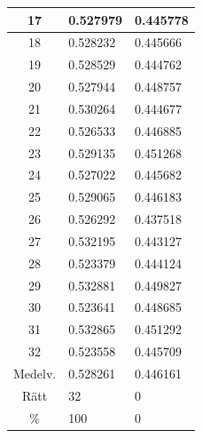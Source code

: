 \documentclass[a4paper,10pt]{article}
\begin{document}
\begin{centering}
{\begin{tabular}{ l | l | l| }
\multicolumn{1}{|c|}{17}   & 0.527979 & 0.445778 \\ \hline
\multicolumn{1}{|c|}{18}   & 0.528232 & 0.445666 \\ \hline
\multicolumn{1}{|c|}{19}   & 0.528529 & 0.444762 \\ \hline
\multicolumn{1}{|c|}{20}   & 0.527944 & 0.448757 \\ \hline
\multicolumn{1}{|c|}{21}   & 0.530264 & 0.444677 \\ \hline
\multicolumn{1}{|c|}{22}   & 0.526533 & 0.446885 \\ \hline
\multicolumn{1}{|c|}{23}   & 0.529135 & 0.451268 \\ \hline
\multicolumn{1}{|c|}{24}   & 0.527022 & 0.445682 \\ \hline
\multicolumn{1}{|c|}{25}   & 0.529065 & 0.446183 \\ \hline
\multicolumn{1}{|c|}{26}   & 0.526292 & 0.437518 \\ \hline
\multicolumn{1}{|c|}{27}   & 0.532195 & 0.443127 \\ \hline
\multicolumn{1}{|c|}{28}   & 0.523379 & 0.444124 \\ \hline
\multicolumn{1}{|c|}{29}   & 0.532881 & 0.449827 \\ \hline
\multicolumn{1}{|c|}{30}   & 0.523641 & 0.448685 \\ \hline
\multicolumn{1}{|c|}{31}   & 0.532865 & 0.451292 \\ \hline
\multicolumn{1}{|c|}{32}   & 0.523558 & 0.445709 \\ \hline\hline
\multicolumn{1}{|c|}{Medelv.} & 0.528261 & 0.446161\\ \hline
\multicolumn{1}{|c|}{Rätt} & 32 & 0\\ \hline
\multicolumn{1}{|c|}{\%} & 100 & 0 \\ \hline
\end{tabular}

}
\end{centering}
\end{document}
